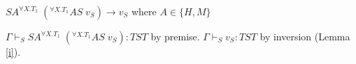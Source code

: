 \begin{case}
$SA^{\forall X.T_{1}}\;(^{\forall X.T_{1}}AS\;v_{S})\rightarrow v_{S}$ where $A\in\lbrace H,M\rbrace$

$\Gamma\vdash_{S}SA^{\forall X.T_{1}}\;(^{\forall X.T_{1}}AS\;v_{S}):TST$ by premise.  $\Gamma\vdash_{S}v_{S}:TST$ by inversion (Lemma \ref{i}).
\end{case}